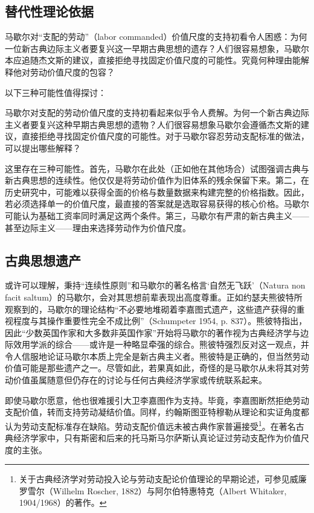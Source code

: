 \begin{translation}
\section{替代性理论依据}

马歇尔对“支配的劳动”（labor commanded）价值尺度的支持初看令人困惑：为何一位新古典边际主义者要复兴这一早期古典思想的遗存？人们很容易想象，马歇尔本应追随杰文斯的建议，直接拒绝寻找固定价值尺度的可能性。究竟何种理由能解释他对劳动价值尺度的包容？

以下三种可能性值得探讨：

马歇尔对支配的劳动价值尺度的支持初看起来似乎令人费解。为何一个新古典边际主义者要复兴这种早期古典思想的遗物？人们很容易想象马歇尔会遵循杰文斯的建议，直接拒绝寻找固定价值尺度的可能性。对于马歇尔容忍劳动支配标准的做法，可以提出哪些解释？

这里存在三种可能性。首先，马歇尔在此处（正如他在其他场合）试图强调古典与新古典思想的连续性。他仅仅是将劳动价值作为旧体系的残余保留下来。第二，在历史研究中，可能难以获得全面的价格与数量数据来构建完整的价格指数。因此，若必须选择单一的价值尺度，最直接的答案就是选取容易获得的核心价格。马歇尔可能认为基础工资率同时满足这两个条件。第三，马歇尔有严肃的新古典主义——甚至边际主义——理由来选择劳动作为价值尺度。

\subsection{古典思想遗产}

或许可以理解，秉持“连续性原则”和马歇尔的著名格言‘自然无飞跃’（Natura non facit saltum）的马歇尔，会对其思想前辈表现出高度尊重。正如约瑟夫熊彼特所观察到的，马歇尔的理论结构“不必要地堆砌着李嘉图式遗产，这些遗产获得的重视程度与其操作重要性完全不成比例”（Schumpeter 1954, p. 837）。熊彼特指出，因此“少数英国作家和大多数非英国作家”开始将马歇尔的著作视为古典经济学与边际效用学派的综合——或许是一种略显牵强的综合。熊彼特强烈反对这一观点，并令人信服地论证马歇尔本质上完全是新古典主义者。熊彼特是正确的，但当然劳动价值可能是那些遗产之一。尽管如此，若果真如此，奇怪的是马歇尔从未将其对劳动价值虽属随意但仍存在的讨论与任何古典经济学家或传统联系起来。

即使马歇尔愿意，他也很难援引大卫李嘉图作为支持。毕竟，李嘉图断然拒绝劳动支配价值，转而支持劳动凝结价值。同样，约翰斯图亚特穆勒从理论和实证角度都认为劳动支配标准存在缺陷。劳动支配价值远未被古典作家普遍接受\footnote{关于古典经济学对劳动投入论与劳动支配论价值理论的早期论述，可参见威廉罗雪尔（Wilhelm Roscher, 1882）与阿尔伯特惠特克（Albert Whitaker, 1904/1968）的著作。}。在著名古典经济学家中，只有斯密和后来的托马斯马尔萨斯认真论证过劳动支配作为价值尺度的主张。


\end{translation}
